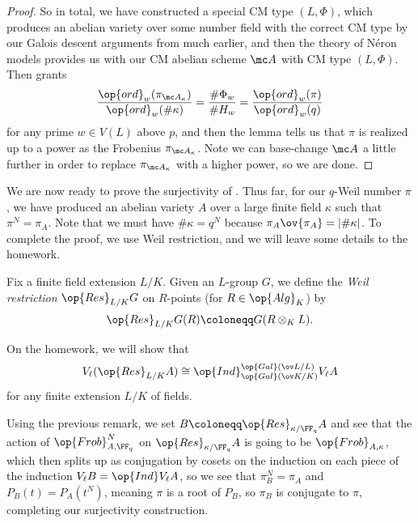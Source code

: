 \documentclass[../notes.tex]{subfiles}
\begin{document}
\begin{proof}
	So in total, we have constructed a special CM type $(L,\Phi)$, which produces an abelian variety over some number field with the correct CM type by our Galois descent arguments from much earlier, and then the theory of N\'eron models provides us with our CM abelian scheme $\mc A$ with CM type $(L,\Phi)$. Then  grants
	\[\frac{\op{ord}_w(\pi_{\mc A_\kappa})}{\op{ord}_w(\#\kappa)}=\frac{\#\Phi_w}{\#H_w}=\frac{\op{ord}_w(\pi)}{\op{ord}_w(q)}\]
	for any prime $w\in V(L)$ above $p$, and then the lemma tells us that $\pi$ is realized up to a power as the Frobenius $\pi_{\mc A_\kappa}$. Note we can base-change $\mc A$ a little further in order to replace $\pi_{\mc A_\kappa}$ with a higher power, so we are done.
\end{proof}
We are now ready to prove the surjectivity of . Thus far, for our $q$-Weil number $\pi$, we have produced an abelian variety $A$ over a large finite field $\kappa$ such that $\pi^N=\pi_A$. Note that we must have $\#\kappa=q^N$ because $\pi_A\ov{\pi_A}=\left|\#\kappa\right|$. To complete the proof, we use Weil restriction, and we will leave some details to the homework.
\begin{definition}
	Fix a finite field extension $L/K$. Given an $L$-group $G$, we define the \textit{Weil restriction} $\op{Res}_{L/K}G$ on $R$-points (for $R\in\op{Alg}_K$) by
	\[\op{Res}_{L/K}G(R)\coloneqq G(R\otimes_KL).\]
\end{definition}
\begin{remark}
	On the homework, we will show that
	\[V_\ell(\op{Res}_{L/K}A)\cong\op{Ind}_{\op{Gal}(\ov K/K)}^{\op{Gal}(\ov L/L)}V_\ell A\]
	for any finite extension $L/K$ of fields.
\end{remark}
Using the previous remark, we set $B\coloneqq\op{Res}_{\kappa/\FF_q}A$ and see that the action of $\op{Frob}_{A,\FF_q}^N$ on $\op{Res}_{\kappa/\FF_q}A$ is going to be $\op{Frob}_{A,\kappa}$, which then splits up as conjugation by cosets on the induction on each piece of the induction $V_\ell B=\op{Ind}V_\ell A$, so we see that $\pi^N_{B}=\pi_A$ and $P_{B}(t)=P_A\left(t^N\right)$, meaning $\pi$ is a root of $P_B$, so $\pi_B$ is conjugate to $\pi$, completing our surjectivity construction.
\end{document}
